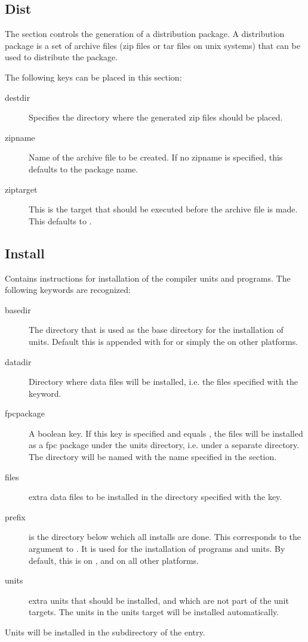 {\subsection{Dist}
The  section controls the generation of a distribution package. 
A distribution package is a set of archive files (zip files or tar files 
on unix systems) that can be used to distribute the package.

The following keys can be placed in this section:
\begin{description}
\item[destdir] Specifies the directory where the generated zip files should
be placed.
\item[zipname] Name of the archive file to be created. If no zipname is
specified, this defaults to the package name.
\item[ziptarget] This is the target that should be executed before the
archive file is made. This defaults to .
\end{description}

\subsection{Install}
Contains instructions for installation of the compiler units and programs. The
following keywords are recognized:
\begin{description}
\item[basedir]
The directory that is used as the base directory for the installation of
units. Default this is  appended with 
for \linux or simply the  on other platforms.
\item[datadir] Directory where data files will be installed, i.e. the files
specified with the  keyword.
\item[fpcpackage] A boolean key. If this key is specified and equals , 
the files will be installed as a fpc package under the \fpc units directory,
i.e. under a separate directory. The directory will be named with the name 
specified in the  section.
\item[files] extra data files to be installed in the directory specified
with the  key.
\item[prefix] is the directory below wchich all installs are done.
This corresponds to the  argument to \gnu {}.
It is used for the installation of programs and units. By default, this is
 on \linux, and  on all other platforms.
\item[units] extra units that should be installed, and which are not part of
the unit targets. The units in the units target will be installed
automatically.
\end{description}
Units will be installed in the subdirectory  
of the  entry.

}
